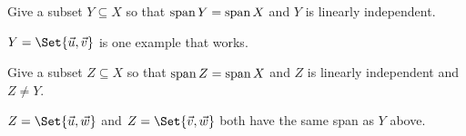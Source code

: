 \documentclass{workbook}
\begin{document}
\begin{slide}
	\begin{parts}[resume]
		\item Give a subset $Y\subseteq X$ so that $\operatorname{span} Y=\operatorname{span} X$ and $Y$ is
			linearly independent.
			\begin{solution}
				$Y = \Set{\vec u,\vec v}$ is one example that works.
			\end{solution}
		\item Give a subset $Z\subseteq X$ so that $\operatorname{span} Z=\operatorname{span} X$ and $Z$ is
			linearly independent and $Z\neq Y$.
			\begin{solution}
				$Z = \Set{\vec u, \vec w}$ and $Z = \Set{\vec v, \vec w}$ both have
				the same span as $Y$ above.
			\end{solution}
	\end{parts}
\end{slide}
\end{document}
